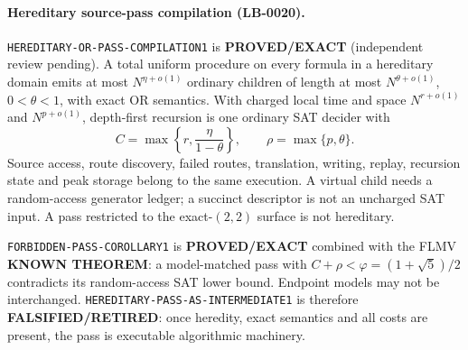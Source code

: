 \documentclass[11pt]{article}
\begin{document}
\paragraph{Hereditary source-pass compilation (LB-0020).}
\texttt{HEREDITARY-OR-PASS-COMPILATION1} is
\textbf{PROVED/EXACT} (independent review pending).  A total uniform
procedure on every formula in a hereditary domain emits at most
\(N^{\eta+o(1)}\) ordinary children of length at most
\(N^{\theta+o(1)}\), \(0<\theta<1\), with exact OR semantics.  With charged
local time and space \(N^{r+o(1)}\) and \(N^{p+o(1)}\), depth-first
recursion is one ordinary SAT decider with
\[
 C=\max\left\{r,\frac{\eta}{1-\theta}\right\},
 \qquad \rho=\max\{p,\theta\}.
\]
Source access, route discovery, failed routes, translation, writing, replay,
recursion state and peak storage belong to the same execution.  A virtual
child needs a random-access generator ledger; a succinct descriptor is not
an uncharged SAT input.  A pass restricted to the exact-\((2,2)\) surface is
not hereditary.

\texttt{FORBIDDEN-PASS-COROLLARY1} is \textbf{PROVED/EXACT} combined with
the FLMV \textbf{KNOWN THEOREM}: a model-matched pass with
\(C+\rho<\varphi=(1+\sqrt5)/2\) contradicts its random-access SAT lower
bound.  Endpoint models may not be interchanged.
\texttt{HEREDITARY-PASS-AS-INTERMEDIATE1} is therefore
\textbf{FALSIFIED/RETIRED}: once heredity, exact semantics and all costs are
present, the pass is executable algorithmic machinery.
\end{document}
